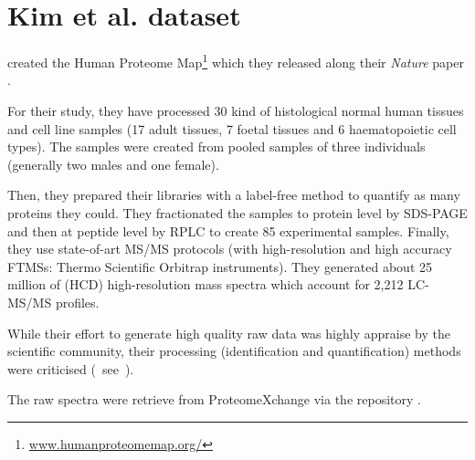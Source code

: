 \section{Kim et al. dataset}
\label{ch:pandeyData}



\cite{PandeyData} created the Human Proteome Map\footnote{%
\href{http://www.humanproteomemap.org/}{\small www.humanproteomemap.org/}} which
they released along their \emph{Nature} paper .

For their study, they have processed 30 kind of histological normal human
tissues and cell line samples (17 adult tissues, 7 foetal tissues and 6
haematopoietic cell types). The samples were created from pooled samples of three
individuals (generally two males and one female).

Then, they prepared their libraries with a label-free method to quantify
as many proteins they could. They fractionated the samples to protein level by
\gls{SDS-PAGE} and then at peptide level by \gls{RPLC} to create 85 experimental
samples. Finally, they use state-of-art \gls{MS/MS} protocols
(with high-resolution and high accuracy \glspl{FTMS}:
Thermo Scientific Orbitrap instruments).
They generated about 25 million of (\gls{HCD})
high-resolution mass spectra which account for 2,212 \gls{LC-MS/MS} profiles.

While their effort to generate high quality raw data was highly appraise
by the scientific community, their processing
(identification and quantification) methods were
criticised (\eg\ see~\cite{Ezkurdia2014-qx}).

The raw spectra were retrieve from ProteomeXchange via the repository
.


\clearpage
